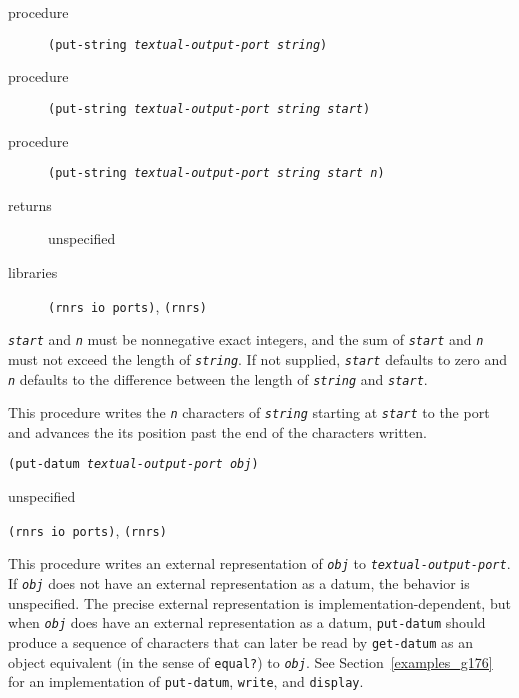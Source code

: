 \begin{description}

\label{io_s72}\item[procedure] \texttt{(put-string \textit{textual-output-port} \textit{string})}



\item[procedure] \texttt{(put-string \textit{textual-output-port} \textit{string} \textit{start})}



\item[procedure] \texttt{(put-string \textit{textual-output-port} \textit{string} \textit{start} \textit{n})}



\item[returns] unspecified


\item[libraries] \texttt{(rnrs io ports)}, \texttt{(rnrs)}
\end{description}

\texttt{\textit{start}} and \texttt{\textit{n}} must be nonnegative exact integers, and the sum of
\texttt{\textit{start}} and \texttt{\textit{n}} must not exceed the length of \texttt{\textit{string}}.
If not supplied, \texttt{\textit{start}} defaults to zero and \texttt{\textit{n}} defaults to
the difference between the length of \texttt{\textit{string}} and \texttt{\textit{start}}.

This procedure writes the \texttt{\textit{n}} characters of \texttt{\textit{string}} starting at
\texttt{\textit{start}} to the port and advances the its position
past the end of the characters written.


\begin{description}

\label{io_s73}\item[procedure] \texttt{(put-datum \textit{textual-output-port} \textit{obj})}



\item[returns] unspecified


\item[libraries] \texttt{(rnrs io ports)}, \texttt{(rnrs)}
\end{description}


This procedure writes an external representation of \texttt{\textit{obj}} to
\texttt{\textit{textual-output-port}}.
If \texttt{\textit{obj}} does not have an external representation as a datum,
the behavior is unspecified.
The precise external representation is implementation-dependent,
but when \texttt{\textit{obj}} does have an external representation as a datum,
\texttt{put-datum} should produce a sequence of characters that
can later be read by \texttt{get-datum} as an object equivalent
(in the sense of \texttt{equal?}) to \texttt{\textit{obj}}.
See Section \ref{examples_g176} for an implementation of \texttt{put-datum},
\texttt{write}, and \texttt{display}.


